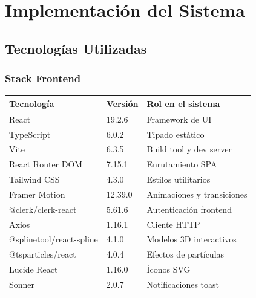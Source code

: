 \documentclass[12pt, a4paper, twoside]{report}
\begin{document}
\chapter{Implementación del Sistema}

\section{Tecnologías Utilizadas}

\subsection*{Stack Frontend}
\begin{center}
\begin{tabular}{L{4.5cm} C{2.5cm} L{6cm}}
  \toprule
  \textbf{Tecnología} & \textbf{Versión} & \textbf{Rol en el sistema} \\
  \midrule
  React                    & 19.2.6   & Framework de UI \\
  TypeScript               & 6.0.2    & Tipado estático \\
  Vite                     & 6.3.5    & Build tool y dev server \\
  React Router DOM         & 7.15.1   & Enrutamiento SPA \\
  Tailwind CSS             & 4.3.0    & Estilos utilitarios \\
  Framer Motion            & 12.39.0  & Animaciones y transiciones \\
  @clerk/clerk-react       & 5.61.6   & Autenticación frontend \\
  Axios                    & 1.16.1   & Cliente HTTP \\
  @splinetool/react-spline & 4.1.0    & Modelos 3D interactivos \\
  @tsparticles/react       & 4.0.4    & Efectos de partículas \\
  Lucide React             & 1.16.0   & Íconos SVG \\
  Sonner                   & 2.0.7    & Notificaciones toast \\
  \bottomrule
\end{tabular}
\end{center}
\end{document}
